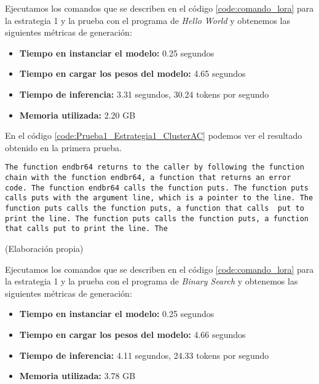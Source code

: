 
Ejecutamos los comandos que se describen en el código \ref{code:comando_lora} para
la estrategia 1 y la prueba con el programa de \textit{Hello World} y obtenemos
las siguientes métricas de generación:

\begin{itemize}
    \item \textbf{Tiempo en instanciar el modelo:} 0.25 segundos
    \item \textbf{Tiempo en cargar los pesos del modelo:} 4.65 segundos
    \item \textbf{Tiempo de inferencia:} 3.31 segundos, 30.24 tokens por segundo
    \item \textbf{Memoria utilizada:} 2.20 GB
\end{itemize}

En el código \ref{code:Prueba1_Estrategia1_ClusterAC} podemos ver el resultado obtenido
en la primera prueba.

\begin{mycode}
    \begin{verbatim}
The function endbr64 returns to the caller by following the function chain with the function endbr64, a function that returns an error code. The function endbr64 calls the function puts. The function puts calls puts with the argument line, which is a pointer to the line. The function puts calls the function puts, a function that calls  put to print the line. The function puts calls the function puts, a function that calls put to print the line. The
    \end{verbatim}
    \caption[]{ (Elaboración propia)}
    \label{code:Prueba1_Estrategia1_ClusterAC}
\end{mycode}

Ejecutamos los comandos que se describen en el código \ref{code:comando_lora} para
la estrategia 1 y la prueba con el programa de \textit{Binary Search} y obtenemos
las siguientes métricas de generación:

\begin{itemize}
    \item \textbf{Tiempo en instanciar el modelo:} 0.25 segundos
    \item \textbf{Tiempo en cargar los pesos del modelo:} 4.66 segundos
    \item \textbf{Tiempo de inferencia:} 4.11 segundos, 24.33 tokens por segundo
    \item \textbf{Memoria utilizada:} 3.78 GB
\end{itemize}

